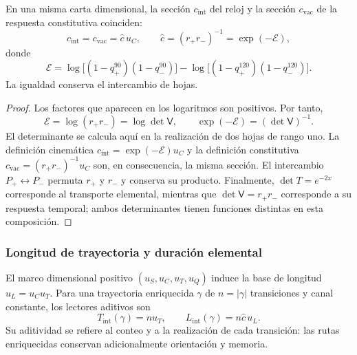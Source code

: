 \begin{proposition}
\label{v:prop:identidad-velocidad}
En una misma carta dimensional, la sección $c_{\mathrm{int}}$ del reloj
y la sección $c_{\mathrm{vac}}$ de la respuesta constitutiva coinciden:
\begin{equation}
 c_{\mathrm{int}}=c_{\mathrm{vac}}
   =\widehat c\,u_C,
 \qquad
 \widehat c=(r_+r_-)^{-1}
            =\exp(-\mathcal E),
 \label{v:eq:identidad-velocidad}
\end{equation}
donde
\begin{equation}
 \mathcal E=
 \log\!\bigl[(1-q_+^{90})(1-q_-^{90})\bigr]
 -\log\!\bigl[(1-q_+^{120})(1-q_-^{120})\bigr].
 \label{v:eq:velocidad-lector-simetrico}
\end{equation}
La igualdad conserva el intercambio de hojas.
\end{proposition}
\begin{proof}
Los factores que aparecen en los logaritmos son positivos. Por tanto,
\[
 \mathcal E=\log(r_+r_-)
            =\log\det\mathsf V,
 \qquad \exp(-\mathcal E)=(\det\mathsf V)^{-1}.
\]
El determinante se calcula aquí en la realización de dos hojas de rango
uno. La definición cinemática $c_{\mathrm{int}}=\exp(-\mathcal E)u_C$
y la definición constitutiva $c_{\mathrm{vac}}=(r_+r_-)^{-1}u_C$
son, en consecuencia, la misma sección. El intercambio $P_+\leftrightarrow
P_-$ permuta $r_+$ y $r_-$ y conserva su producto. Finalmente,
$\det T=e^{-2x}$ corresponde al transporte elemental, mientras que
$\det\mathsf V=r_+r_-$ corresponde a su respuesta temporal; ambos
determinantes tienen funciones distintas en esta composición.
\end{proof}

\subsubsection{Longitud de trayectoria y duración elemental}

El marco dimensional positivo $(u_S,u_C,u_T,u_Q)$ induce la base de
longitud $u_L=u_Cu_T$. Para una trayectoria enriquecida $\gamma$ de
$n=|\gamma|$ transiciones y canal constante, los lectores aditivos son
\begin{equation}
 T_{\mathrm{int}}(\gamma)=n u_T,
 \qquad L_{\mathrm{int}}(\gamma)=n\widehat c\,u_L.
 \label{v:eq:velocidad-longitud-reloj}
\end{equation}
Su aditividad se refiere al conteo y a la realización de cada transición:
las rutas enriquecidas conservan adicionalmente orientación y memoria.

